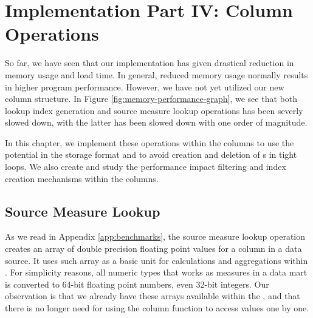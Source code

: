 \chapter{Implementation Part IV: Column Operations}
\label{chap:operations}

So far, we have seen that our implementation has given drastical reduction in memory usage and load time. In general, reduced memory usage normally results in higher program performance. However, we have not yet utilized our new column structure. In Figure \ref{fig:memory-performance-graph}, we see that both lookup index generation and source measure lookup operations has been severly slowed down, with the latter has been slowed down with one order of magnitude.

In this chapter, we implement these operations within the columns to use the potential in the storage format and to avoid creation and deletion of s in tight loops. We also create and study the performance impact filtering and index creation mechanisms within the columns.

\section{Source Measure Lookup}
\label{sec:Source Measure Lookup}
As we read in Appendix \ref{app:benchmarks}, the source measure lookup operation creates an array of double precision floating point values for a column in a data source. It uses such array as a basic unit for calculations and aggregations within \gd. For simplicity reasons, all numeric types that works as measures in a data mart is converted to 64-bit floating point numbers, even 32-bit integers. Our observation is that we already have these arrays available within the , and that there is no longer need for using the column  function to access values one by one.


